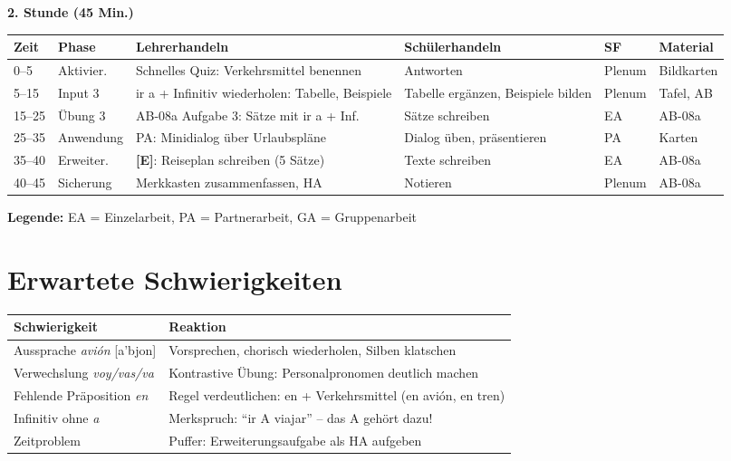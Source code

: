 \documentclass[11pt,a4paper]{article}
\newcommand{\E}{\textcolor{erweiterung}{\textbf{[E]}}}
\begin{document}
\vspace{1em}

\textbf{2. Stunde (45 Min.)}

\begin{longtable}{|p{1cm}|p{1.5cm}|p{4cm}|p{3cm}|p{1.5cm}|p{2cm}|}
\hline
\textbf{Zeit} & \textbf{Phase} & \textbf{Lehrerhandeln} & \textbf{Schülerhandeln} & \textbf{SF} & \textbf{Material} \\
\hline
\endhead

0--5 & Aktivier. & Schnelles Quiz: Verkehrsmittel benennen & Antworten & Plenum & Bildkarten \\
\hline

5--15 & Input 3 & ir a + Infinitiv wiederholen: Tabelle, Beispiele & Tabelle ergänzen, Beispiele bilden & Plenum & Tafel, AB \\
\hline

15--25 & Übung 3 & AB-08a Aufgabe 3: Sätze mit ir a + Inf. & Sätze schreiben & EA & AB-08a \\
\hline

25--35 & Anwendung & PA: Minidialog über Urlaubspläne & Dialog üben, präsentieren & PA & Karten \\
\hline

35--40 & Erweiter. & \E{}: Reiseplan schreiben (5 Sätze) & Texte schreiben & EA & AB-08a \\
\hline

40--45 & Sicherung & Merkkasten zusammenfassen, HA & Notieren & Plenum & AB-08a \\
\hline
\end{longtable}

\textbf{Legende:} EA = Einzelarbeit, PA = Partnerarbeit, GA = Gruppenarbeit

\section{Erwartete Schwierigkeiten}

\begin{tabular}{|p{4.5cm}|p{8cm}|}
\hline
\textbf{Schwierigkeit} & \textbf{Reaktion} \\
\hline
Aussprache \textit{avión} [a'bjon] & Vorsprechen, chorisch wiederholen, Silben klatschen \\
\hline
Verwechslung \textit{voy/vas/va} & Kontrastive Übung: Personalpronomen deutlich machen \\
\hline
Fehlende Präposition \textit{en} & Regel verdeutlichen: en + Verkehrsmittel (en avión, en tren) \\
\hline
Infinitiv ohne \textit{a} & Merkspruch: ``ir A viajar'' -- das A gehört dazu! \\
\hline
Zeitproblem & Puffer: Erweiterungsaufgabe als HA aufgeben \\
\hline
\end{tabular}
\end{document}
